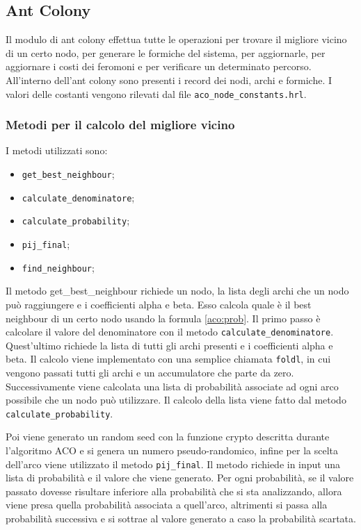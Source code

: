 \subsection{Ant Colony}\label{04:ant_colony}
Il modulo di ant colony effettua tutte le operazioni per trovare il migliore vicino di un certo nodo, per generare le formiche del sistema, per aggiornarle, per aggiornare i costi dei feromoni e per verificare un determinato percorso.
All'interno dell'ant colony sono presenti i record dei nodi, archi e formiche.
I valori delle costanti vengono rilevati dal file \texttt{aco\_node\_constants.hrl}.

\subsubsection{Metodi per il calcolo del migliore vicino}
I metodi utilizzati sono:
\begin{itemize}
    \item \texttt{get\_best\_neighbour};
    \item \texttt{calculate\_denominatore};
    \item \texttt{calculate\_probability};
    \item \texttt{pij\_final};
    \item \texttt{find\_neighbour};
\end{itemize}
Il metodo get\_best\_neighbour richiede un nodo, la lista degli archi che un nodo può raggiungere e i coefficienti alpha e beta. Esso calcola quale è il best neighbour di un certo nodo usando la formula \ref{aco:prob}.
Il primo passo è calcolare il valore del denominatore con il metodo \texttt{calculate\_denominatore}. Quest'ultimo richiede la lista di tutti gli archi presenti e i coefficienti alpha e beta. Il calcolo viene implementato con una semplice chiamata \texttt{foldl}, in cui vengono passati tutti gli archi e un accumulatore che parte da zero.
Successivamente viene calcolata una lista di probabilità associate ad ogni arco possibile che un nodo può utilizzare. Il calcolo della lista viene fatto dal metodo \texttt{calculate\_probability}. 

Poi viene generato un random seed con la funzione crypto descritta durante l'algoritmo ACO e si genera un numero pseudo-randomico, infine per la scelta dell'arco viene utilizzato il metodo \texttt{pij\_final}.
Il metodo richiede in input una lista di probabilità e il valore che viene generato. Per ogni probabilità, se il valore passato dovesse risultare inferiore alla probabilità che si sta analizzando, allora viene presa quella probabilità associata a quell'arco, altrimenti si passa alla probabilità successiva e si sottrae al valore generato a caso la probabilità scartata.

